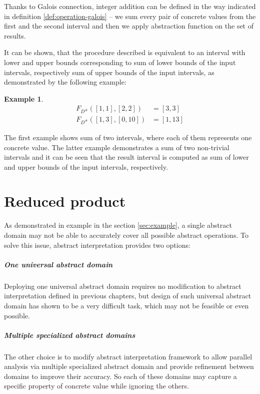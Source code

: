 \documentclass[12pt,oneside]{fithesis2}
\theoremstyle{definition}
\newtheorem{exmp}{Example}[section]
\begin{document}
Thanks to Galois connection, integer addition can be defined in the way indicated in definition \ref{def:operation-galois} -- we sum every pair of concrete values from the first and the second interval and then we apply abstraction function on the set of results.

It can be shown, that the procedure described is equivalent to an interval with lower and upper bounds corresponding to sum of lower bounds of the input intervals, respectively sum of upper bounds of the input intervals, as demonstrated by the following example:

\begin{exmp}
  \begin{align*}
    F_{D^\#}([1,1], [2,2]) &= [3,3]\\
    F_{D^\#}([1,3], [0,10]) &= [1,13]
  \end{align*}
\end{exmp}

The first example shows sum of two intervals, where each of them represents one concrete value. The latter example demonstrates a sum of two non-trivial intervals and it can be seen that the result interval is computed as sum of lower and upper bounds of the input intervals, respectively.

\chapter{Reduced product}\label{ch:reduced-product}

As demonstrated in example in the section \ref{sec:example}, a single abstract domain may not be able to accurately cover all possible abstract operations. To solve this issue, abstract interpretation provides two options:

\paragraph{One universal abstract domain}
Deploying one universal abstract domain requires no modification to abstract interpretation defined in previous chapters, but design of such universal abstract domain has shown to be a very difficult task, which may not be feasible or even possible.

\paragraph{Multiple specialized abstract domains}
The other choice is to modify abstract interpretation framework to allow parallel analysis via multiple specialized abstract domain and provide refinement between domains to improve their accuracy. So each of these domains may capture a specific property of concrete value while ignoring the others.
\end{document}
